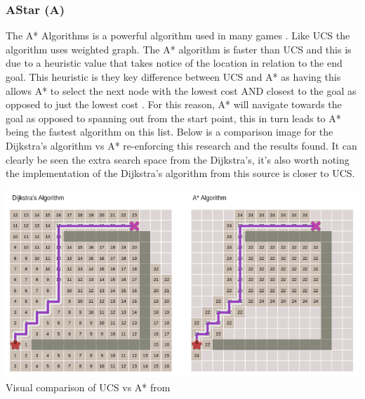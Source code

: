 \subsubsection{AStar (A\*)}
The A* Algorithms is a powerful algorithm used in many games \citetemp. Like UCS the algorithm uses weighted graph. The A* algorithm is faster than UCS and this is due to a heuristic value that takes notice of the location in relation to the end goal. This heuristic is they key difference between UCS and A* as having this allows A* to select the next node with the lowest cost AND closest to the goal as opposed to just the lowest cost \citetemp. For this reason, A* will navigate towards the goal as opposed to spanning out from the start point, this in turn leads to A* being the fastest algorithm on this list. Below is a comparison image for the Dijkstra's algorithm vs A* re-enforcing this research and the results found. It can clearly be seen the extra search space from the Dijkstra's, it's also worth noting the implementation of the Dijkstra's algorithm from this source is closer to UCS. 
\begin{center}
	\includegraphics[width=\linewidth]{images/research/Dijkstrasvastar.png}\\
	Visual comparison of UCS vs A* from \citetemp
\end{center}


